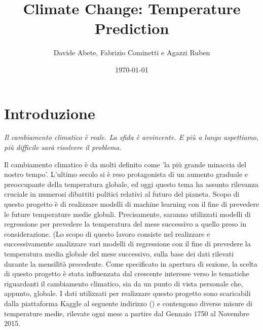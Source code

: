 \documentclass[12pt, a4paper, twocolumn]{article} %
\title{Climate Change: Temperature Prediction} %
\author{
	Davide Abete, Fabrizio Cominetti e Agazzi Ruben %
}
\date{\today} %
\begin{document}
\maketitle %

\thispagestyle{firstpage} %

\tableofcontents
\bigskip
\bigskip
\bigskip
\bigskip
\bigskip
{}


\section{Introduzione}
\textit{Il cambiamento climatico è reale. La sfida è avvincente. E più a lungo aspettiamo, più difficile sarà risolvere il problema.} \cite{climatequote}
\bigskip

Il cambiamento climatico è da molti definito come 'la più grande minaccia del nostro tempo'. L'ultimo secolo si è reso protagonista di un aumento graduale e preoccupante della temperatura globale, ed oggi questo tema ha assunto rilevanza cruciale in numerosi dibattiti politici relativi al futuro del pianeta. \cite{climatepaper} %
Scopo di questo progetto è di realizzare modelli di machine learning con il fine di prevedere le future temperature medie globali. Precisamente, saranno utilizzati modelli di regressione per prevedere la temperatura del mese successivo a quello preso in considerazione.
(Lo scopo di questo lavoro consiste nel realizzare e successivamente analizzare vari modelli di regressione con il fine di prevedere la temperatura media globale del mese successivo, sulla base dei dati rilevati durante la mensilità precedente.
Come specificato in apertura di sezione, la scelta di questo progetto è stata influenzata dal crescente interesse verso le tematiche riguardanti il cambiamento climatico, sia da un punto di vista personale che, appunto, globale.
I dati utilizzati per realizzare questo progetto sono scaricabili dalla piattaforma Kaggle al seguente indirizzo () e contengono diverse misure di temperature medie, rilevate ogni mese a partire dal Gennaio 1750 al Novembre 2015.
\end{document}
